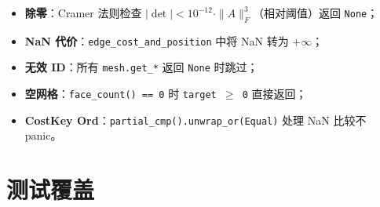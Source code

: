 \documentclass[11pt,a4paper]{article}
\begin{document}
\begin{itemize}
  \item \textbf{除零}：Cramer 法则检查 $|\det| < 10^{-12} \cdot \|A\|_F^3$（相对阈值）返回 \texttt{None}；
  \item \textbf{NaN 代价}：\texttt{edge\_cost\_and\_position} 中将 NaN 转为 $+\infty$；
  \item \textbf{无效 ID}：所有 \texttt{mesh.get\_*} 返回 \texttt{None} 时跳过；
  \item \textbf{空网格}：\texttt{face\_count() == 0} 时 \texttt{target $\ge$ 0} 直接返回；
  \item \textbf{CostKey Ord}：\texttt{partial\_cmp().unwrap\_or(Equal)} 处理 NaN 比较不 panic。
\end{itemize}

\section{测试覆盖}
\end{document}

